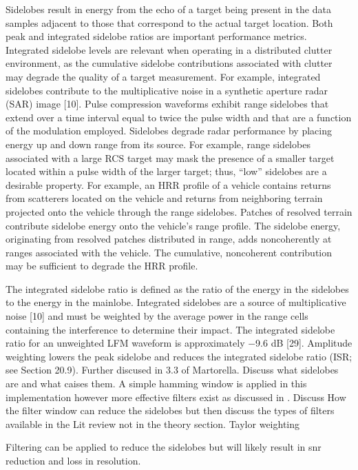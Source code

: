 \documentclass[class=report,11pt,crop=false]{standalone}
\begin{document}
    Sidelobes result in energy from the echo of a target being present in the data samples adjacent to those that correspond to the actual target location.  %
    Both peak and integrated sidelobe ratios are important performance metrics. Integrated sidelobe levels are relevant when operating in a distributed clutter environment, as the cumulative sidelobe contributions associated with clutter may degrade the quality of a target measurement. For example, integrated sidelobes contribute to the multiplicative noise in a synthetic aperture radar (SAR) image [10]. %
    Pulse compression waveforms exhibit range sidelobes that extend over a time interval equal to twice the pulse width and that are a function of the modulation employed. Sidelobes degrade radar performance by placing energy up and down range from its source. For example, range sidelobes associated with a large RCS target may mask the presence of a smaller target located within a pulse width of the larger target; thus, “low” sidelobes are a desirable property. %
    For example, an HRR profile of a vehicle contains returns from scatterers located on the vehicle and returns from neighboring terrain projected onto the vehicle through the range sidelobes. Patches of resolved terrain contribute sidelobe energy onto the vehicle’s range profile. The sidelobe energy, originating from resolved patches distributed in range, adds noncoherently at ranges associated with the vehicle. The cumulative, noncoherent contribution may be sufficient to degrade the HRR profile.
    
The integrated sidelobe ratio is defined as the ratio of the energy in the sidelobes to the energy in the mainlobe. Integrated sidelobes are a source of multiplicative noise [10] and must be weighted by the average power in the range cells containing the interference to determine their impact. The integrated sidelobe ratio for an unweighted LFM waveform is approximately −9.6 dB [29]. Amplitude weighting lowers the peak sidelobe and reduces the integrated sidelobe ratio (ISR; see Section 20.9). %
Further discused in 3.3 of Martorella.
    Discuss what sidelobes are and what caises them. 
    A simple hamming window is applied in this implementation however more effective filters exist as discussed in \cite{ISARtextbook_Martorella}.
    Discuss How the filter window can reduce the sidelobes but then discuss the types of filters available in the Lit review not in the theory section. Taylor weighting %
    
    Filtering can be applied to reduce the sidelobes but will likely result in snr reduction and loss in resolution. %
    
\end{document}
